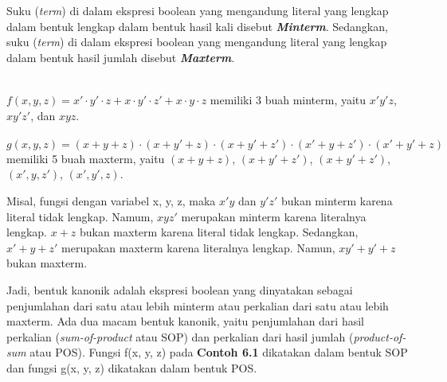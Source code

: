\documentclass[11pt]{article}
\theoremstyle{definitionstyle}
\theoremstyle{theoremstyle}
\theoremstyle{examplestyle}
\begin{document}
Suku (\textit{term}) di dalam ekspresi boolean yang mengandung literal yang lengkap dalam bentuk lengkap dalam bentuk hasil kali disebut \textbf{\textit{Minterm}}. Sedangkan, suku (\textit{term}) di dalam ekspresi boolean yang mengandung literal yang lengkap dalam bentuk hasil jumlah disebut \textbf{\textit{Maxterm}}.
\begin{example} \hfill \\
    $f(x, y, z) = x' \cdot y' \cdot z + x \cdot y' \cdot z' + x \cdot y \cdot z$ memiliki 3 buah minterm, yaitu $x'y'z$, $xy'z'$, dan $xyz$. \\ \\
    $g(x, y, z) = (x + y + z) \cdot (x + y' + z) \cdot (x + y' + z') \cdot (x' + y + z') \cdot (x' + y' + z)$ memiliki 5 buah maxterm, yaitu $(x + y  + z)$, $(x + y' + z')$, $(x + y' + z')$, $(x', y, z')$, $(x', y', z)$. 
\end{example}

Misal, fungsi dengan variabel x, y, z, maka $x'y$ dan $y'z'$ bukan minterm karena literal tidak lengkap. Namum, $xyz'$ merupakan minterm karena literalnya lengkap. $x + z$ bukan maxterm karena literal tidak lengkap. Sedangkan, $x' + y + z'$ merupakan maxterm karena literalnya lengkap. Namun, $xy' + y' + z$ bukan maxterm.

Jadi, bentuk kanonik adalah ekspresi boolean yang dinyatakan sebagai penjumlahan dari satu atau lebih minterm atau perkalian dari satu atau lebih maxterm. Ada dua macam bentuk kanonik, yaitu penjumlahan dari hasil perkalian (\textit{sum-of-product} atau SOP) dan perkalian dari hasil jumlah (\textit{product-of-sum} atau POS). Fungsi f(x, y, z) pada \textbf{Contoh 6.1} dikatakan dalam bentuk SOP dan fungsi g(x, y, z) dikatakan dalam bentuk POS. 
\end{document}
